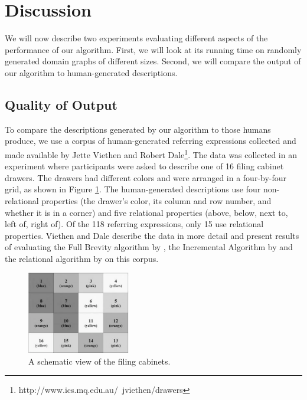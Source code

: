 \section{Discussion} \label{sec:discussion}

We will now describe two experiments evaluating different aspects of
the performance of our algorithm. First, we will look at its running
time on randomly generated domain graphs of different sizes. Second,
we will compare the output of our algorithm to human-generated
descriptions.



\subsection{Quality of Output}

To compare the descriptions generated by our algorithm to
those humans produce, we use a corpus of
human-generated referring expressions collected and made available by
Jette Viethen and Robert
Dale\footnote{http://www.ics.mq.edu.au/~jviethen/drawers}.  The data
was collected in an experiment where participants were asked to
describe one of 16 filing cabinet drawers. The drawers had different
colors and were arranged in a four-by-four grid, as shown in Figure
\ref{fig:drawers}. The human-generated descriptions use four
non-relational properties (the drawer's \textsf{color}, its \textsf{column} and
\textsf{row} number, and whether it is in a \textsf{corner}) and five
relational properties (\textsf{above, below, next to, left of, right
of}). Of the 118 referring expressions, only 15 use relational properties.
Viethen and Dale 
describe the data in more detail and present results of evaluating the
Full Brevity algorithm by \cite{}, the Incremental Algorithm by
\cite{} and the relational algorithm by \cite{} on this corpus.

\begin{figure}
\includegraphics[width=0.4\textwidth]{drawers}
\caption{A schematic view of the filing cabinets.}\label{fig:drawers}
\end{figure}


